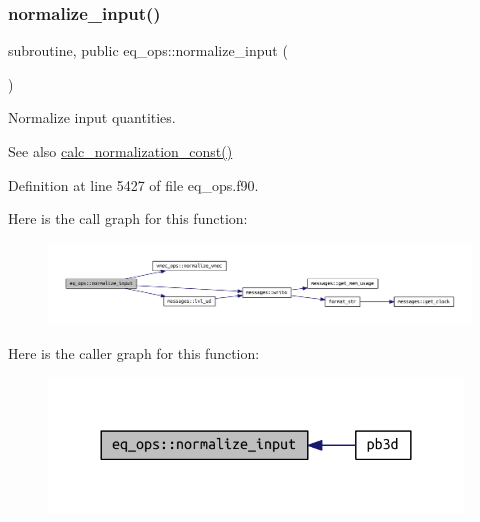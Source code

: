 \subsubsection{\texorpdfstring{normalize\+\_\+input()}{normalize\_input()}}
{\footnotesize\ttfamily subroutine, public eq\+\_\+ops\+::normalize\+\_\+input (\begin{DoxyParamCaption}{ }\end{DoxyParamCaption})}



Normalize input quantities. 

\begin{DoxySeeAlso}{See also}
\hyperlink{namespaceeq__ops_a7cd38586e386e1bc684a327ebcc4c1de}{calc\+\_\+normalization\+\_\+const()} 
\end{DoxySeeAlso}


Definition at line 5427 of file eq\+\_\+ops.\+f90.

Here is the call graph for this function\+:
\nopagebreak
\begin{figure}[H]
\begin{center}
\leavevmode
\includegraphics[width=350pt]{namespaceeq__ops_a1b4c764da73624722d7e76498a2b80a9_cgraph}
\end{center}
\end{figure}
Here is the caller graph for this function\+:
\nopagebreak
\begin{figure}[H]
\begin{center}
\leavevmode
\includegraphics[width=312pt]{namespaceeq__ops_a1b4c764da73624722d7e76498a2b80a9_icgraph}
\end{center}
\end{figure}
\mbox{\label{namespaceeq__ops_a8082c12510696bd8ffdd0deef41860c2}} 
